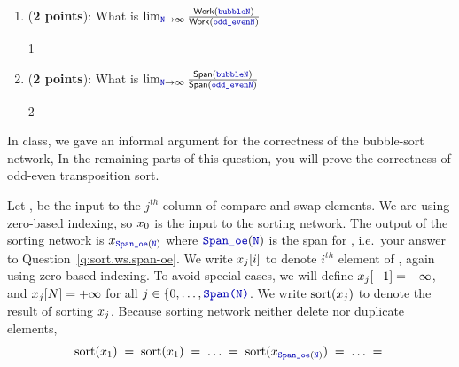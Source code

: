 \documentclass{article}
\newenvironment{answer}
{\par\color{blue}}
{\normalfont\par}
\newcounter{saveenumii}
\begin{document}
\begin{enumerate}
\begin{enumerate}
\begin{enumerate}
                        \item (\textbf{2 points}): What is
                              \begin{math}
                                  \lim_{\code{\scriptsize{N}} \rightarrow \infty}
                                  \frac{\mathsf{Work}(\code{\scriptsize{bubble{N}}})}{\mathsf{Work}(\code{\scriptsize{odd\_even{N}}})}
                              \end{math}
                              \begin{answer}
                                  1
                              \end{answer}
                        \item (\textbf{2 points}): What is
                              \begin{math}
                                  \lim_{\code{\scriptsize{N}} \rightarrow \infty}
                                  \frac{\mathsf{Span}(\code{\scriptsize{bubble{N}}})}{\mathsf{Span}(\code{\scriptsize{odd\_even{N}}})}
                              \end{math}
                              \begin{answer}
                                  2
                              \end{answer}
                    \end{enumerate}\setcounter{saveenumii}{\value{enumii}}
          \end{enumerate}

          In class, we gave an informal argument for the correctness of the bubble-sort network,
          In the remaining parts of this question, you will prove the correctness of odd-even transposition sort.
          \newcommand{\spoe}{\ensuremath{\code{Span\_{oe}}(\code{N})}}
          \par
          Let , be the input to the $j^{th}$ column of compare-and-swap elements.
          We are using zero-based indexing, so $x_{0}$ is the input to the sorting network.
          The output of the sorting network is $\xj{\scriptstyle{\spoe}}$
          where \spoe{} is the span for , i.e.\ your answer to Question~\ref{q:sort.ws.span-oe}.
          We write $x_{j}[i]$ to denote $i^{th}$ element of , again using zero-based indexing.
          To avoid special cases, we will define $x_{j}[-1] = -\infty$, and
          $x_{j}[N] = +\infty$ for all $j \in \{0, \ldots, \code{Span(N)}$.
          We write $\mathrm{sort}(x_{j})$ to denote the result of sorting $x_{j}$.
          Because sorting network neither delete nor duplicate elements,
          \begin{displaymath}
              \mathrm{sort}(\xj{1}) \;=\;
              \mathrm{sort}(\xj{1}) \;=\; \ldots \;=\;
              \mathrm{sort}(\xj{\scriptstyle{\spoe}}) \;=\; \ldots \;=\;
          \end{displaymath}


\end{enumerate}
\end{document}
